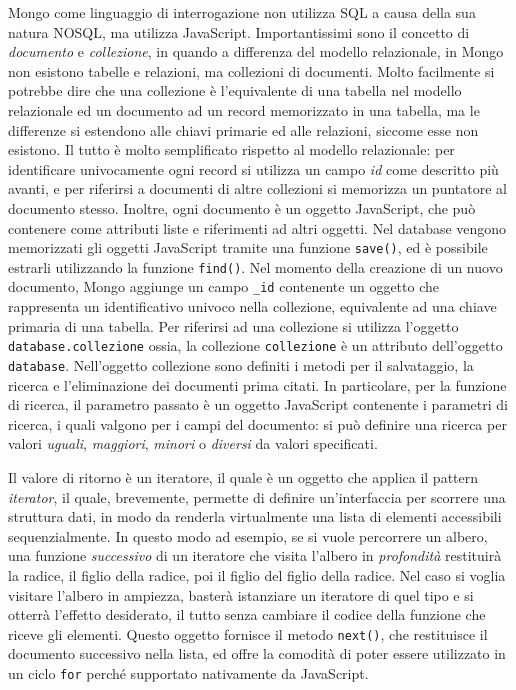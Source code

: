 Mongo come linguaggio di interrogazione non utilizza SQL a causa della sua natura NOSQL, ma utilizza JavaScript. Importantissimi sono il concetto di \emph{documento} e \emph{collezione}, in quando a differenza del modello relazionale, in Mongo non esistono tabelle e relazioni, ma collezioni di documenti. Molto facilmente si potrebbe dire che una collezione è l'equivalente di una tabella nel modello relazionale ed un documento ad un record memorizzato in una tabella, ma le differenze si estendono alle chiavi primarie ed alle relazioni, siccome esse non esistono. Il tutto è molto semplificato rispetto al modello relazionale: per identificare univocamente ogni record si utilizza un campo \emph{id} come descritto più avanti, e per riferirsi a documenti di altre collezioni si memorizza un puntatore al documento stesso. Inoltre, ogni documento è un oggetto JavaScript, che può contenere come attributi liste e riferimenti ad altri oggetti. Nel database vengono memorizzati gli oggetti JavaScript tramite una funzione \texttt{save()}, ed è possibile estrarli utilizzando la funzione \texttt{find()}. Nel momento della creazione di un nuovo documento, Mongo aggiunge un campo \texttt{\_id} contenente un oggetto che rappresenta un identificativo univoco nella collezione, equivalente ad una chiave primaria di una tabella.
Per riferirsi ad una collezione si utilizza l'oggetto 
\texttt{database.collezione}
ossia, la collezione \texttt{collezione} è un attributo dell'oggetto \texttt{database}. Nell'oggetto collezione sono definiti i metodi per il salvataggio, la ricerca e l'eliminazione dei documenti prima citati. In particolare, per la funzione di ricerca, il parametro passato è un oggetto JavaScript contenente i parametri di ricerca, i quali valgono per i campi del documento: si può definire una ricerca per valori \emph{uguali}, \emph{maggiori}, \emph{minori} o \emph{diversi} da valori specificati. 

Il valore di ritorno è un iteratore, il quale è un oggetto che applica il pattern \emph{iterator}, il quale, brevemente, permette di definire un'interfaccia per scorrere una struttura dati, in modo da renderla virtualmente una lista di elementi accessibili sequenzialmente. In questo modo ad esempio, se si vuole percorrere un albero, una funzione \emph{successivo} di un iteratore che visita l'albero in \emph{profondità} restituirà la radice, il figlio della radice, poi il figlio del figlio della radice. Nel caso si voglia visitare l'albero in ampiezza, basterà istanziare un iteratore di quel tipo e si otterrà l'effetto desiderato, il tutto senza cambiare il codice della funzione che riceve gli elementi. Questo oggetto fornisce il metodo \texttt{next()}, che restituisce il documento successivo nella lista, ed offre la comodità di poter essere utilizzato in un ciclo \texttt{for} perché supportato nativamente da JavaScript.

